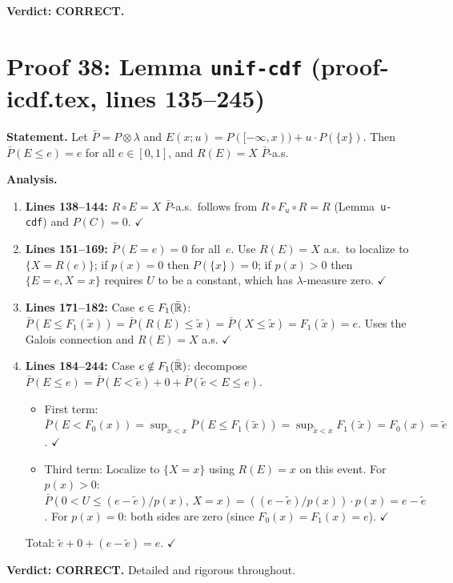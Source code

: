 \documentclass{article}
\begin{document}
\textbf{Verdict: CORRECT.}

\section{Proof 38: Lemma \texttt{unif-cdf} (proof-icdf.tex, lines 135--245)}

\textbf{Statement.} Let $\bar P=P\otimes\lambda$ and
$E(x;u)=P([-\infty,x))+u\cdot P(\{x\})$.  Then $\bar P(E\le e)=e$ for all
$e\in[0,1]$, and $R(E)=X$ $\bar P$-a.s.

\textbf{Analysis.}
\begin{enumerate}[leftmargin=*]
  \item \textbf{Lines 138--144:} $R\circ E=X$ $\bar P$-a.s.\
    follows from $R\circ F_u\circ R=R$ (Lemma~\texttt{u-cdf}) and $P(C)=0$.  $\checkmark$
  \item \textbf{Lines 151--169:} $\bar P(E=e)=0$ for all~$e$.
    Use $R(E)=X$ a.s.\ to localize to $\{X=R(e)\}$;
    if $p(x)=0$ then $P(\{x\})=0$; if $p(x)>0$ then $\{E=e,X=x\}$
    requires $U$ to be a constant, which has $\lambda$-measure zero.  $\checkmark$
  \item \textbf{Lines 171--182:} Case $e\in F_1(\bar{\mathbb{R}})$:
    $\bar P(E\le F_1(\tilde x))=\bar P(R(E)\le\tilde x)=\bar P(X\le\tilde x)
    =F_1(\tilde x)=e$.
    Uses the Galois connection and $R(E)=X$ a.s.  $\checkmark$
  \item \textbf{Lines 184--244:} Case $e\notin F_1(\bar{\mathbb{R}})$:
    decompose $\bar P(E\le e)=\bar P(E<\tilde e)+0+\bar P(\tilde e<E\le e)$.
    \begin{itemize}
      \item First term: $\bar P(E<F_0(x))=\sup_{\tilde x<x}\bar P(E\le F_1(\tilde x))
            =\sup_{\tilde x<x}F_1(\tilde x)=F_0(x)=\tilde e$.  $\checkmark$
      \item Third term: Localize to $\{X=x\}$ using $R(E)=x$ on this event.
            For $p(x)>0$: $\bar P(0<U\le(e-\tilde e)/p(x),\,X=x)
            =((e-\tilde e)/p(x))\cdot p(x)=e-\tilde e$.
            For $p(x)=0$: both sides are zero (since $F_0(x)=F_1(x)=e$).  $\checkmark$
    \end{itemize}
    Total: $\tilde e+0+(e-\tilde e)=e$.  $\checkmark$
\end{enumerate}

\textbf{Verdict: CORRECT.}  Detailed and rigorous throughout.
\end{document}

